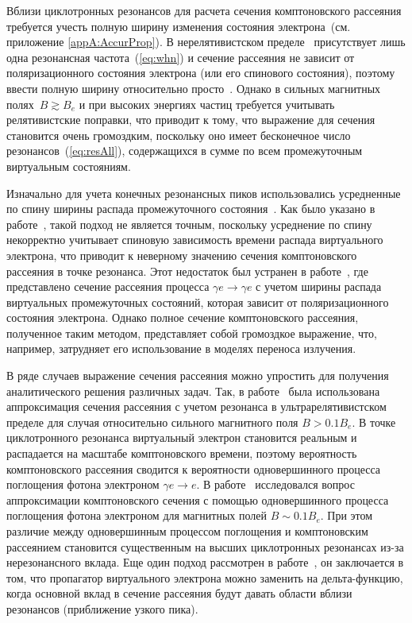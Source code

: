 Вблизи 
циклотронных резонансов для расчета сечения 
комптоновского рассеяния требуется учесть полную 
ширину изменения состояния \linebreak электрона~(см. приложение \ref{appA:AccurProp}). В нерелятивистском 
пределе~\cite{Canuto:1971} присутствует лишь одна резонансная 
частота~(\ref{eq:whn}) и сечение рассеяния
не зависит от поляризационного состояния электрона (или его спинового состояния), 
поэтому ввести полную ширину относительно просто~\cite{Daugherty:1989}. Однако 
в сильных магнитных полях~$B\gtrsim B_e$ и при высоких энергиях частиц 
требуется учитывать релятивистские поправки, что приводит к тому, что выражение 
для  сечения 
становится очень громоздким, поскольку оно имеет бесконечное число 
резонансов~(\ref{eq:resAll}), 
содержащихся в сумме по всем промежуточным виртуальным состояниям.

Изначально для учета конечных резонансных пиков использовались усредненные по спину ширины распада промежуточного состояния~\cite{Gonthier:2000}. 
Как было указано в работе~\cite{Gonthier:2014}, такой подход не является 
точным, поскольку усреднение по спину некорректно учитывает спиновую 
зависимость времени распада виртуального электрона, что приводит к неверному значению сечения комптоновского рассеяния в точке 
резонанса. Этот недостаток был устранен в работе~\cite{Mushtukov:2016}, где 
представлено сечение рассеяния процесса $\gamma e\to \gamma e$ с учетом 
ширины распада виртуальных промежуточных состояний, которая 
зависит от 
поляризационного состояния электрона. 
Однако полное сечение комптоновского рассеяния, полученное таким методом, 
представляет собой громоздкое выражение, что, например, затрудняет его 
использование в моделях переноса излучения. 

В ряде случаев выражение сечения рассеяния можно упростить для получения 
аналитического 
решения различных задач. 
Так, в работе~\cite{Gonthier:2000} была использована 
аппроксимация сечения рассеяния с учетом резонанса в ультрарелятивистском 
пределе для случая относительно сильного магнитного поля $B>0.1 B_e$. В точке 
циклотронного резонанса виртуальный электрон становится реальным и распадается 
на масштабе комптоновского времени, поэтому вероятность
комптоновского рассеяния сводится к вероятности одновершинного процесса 
поглощения фотона электроном $\gamma 
e \to e$. В 
работе~\cite{Harding:1991} исследовался вопрос аппроксимации комптоновского 
сечения с помощью одновершинного процесса поглощения фотона электроном для 
магнитных полей 
$B\sim 
0.1B_e$. При этом различие между одновершинным процессом поглощения и комптоновским 
рассеянием становится существенным на высших циклотронных резонансах из-за 
нерезонансного вклада. Еще один подход рассмотрен в 
работе~\cite{Rumyantsev:2017}, он заключается в том, что пропагатор 
виртуального электрона можно заменить 
на дельта-функцию, когда основной вклад 
в сечение рассеяния будут давать области вблизи резонансов (приближение узкого 
пика). 
 
